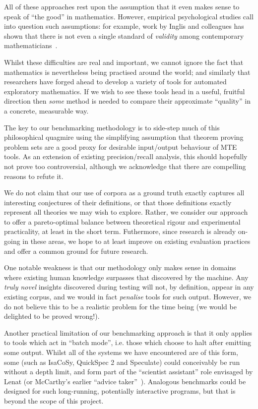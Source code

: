All of these approaches rest upon the assumption that it even makes sense to
speak of ``the good'' in mathematics. However, empirical psychological studies
call into question such assumptions: for example, work by Inglis and colleagues
has shown that there is not even a single standard of \emph{validity} among
contemporary mathematicians~\cite{inglis2013mathematicians}.

Whilst these difficulties are real and important, we cannot ignore the fact that
mathematics is nevertheless being practised around the world; and similarly that
researchers have forged ahead to develop a variety of tools for automated
exploratory mathematics. If we wish to see these tools head in a useful,
fruitful direction then \emph{some} method is needed to compare their
approximate ``quality'' in a concrete, measurable way.

The key to our benchmarking methodology is to side-step much of this
philosophical quagmire using the simplifying assumption that theorem proving
problem sets are a good proxy for desirable input/output behaviour of MTE tools.
As an extension of existing precision/recall analysis, this should hopefully not
prove too controversial, although we acknowledge that there are compelling
reasons to refute it.

We do not claim that our use of corpora as a ground truth exactly captures all
interesting conjectures of their definitions, or that those definitions exactly
represent all theories we may wish to explore. Rather, we consider our approach
to offer a pareto-optimal balance between theoretical rigour and experimental
practicality, at least in the short term. Futhermore, since research is already
on-going in these areas, we hope to at least improve on existing evaluation
practices and offer a common ground for future research.

One notable weakness is that our methodology only makes sense in domains where
existing human knowledge surpasses that discovered by the machine. Any
\emph{truly novel} insights discovered during testing will not, by definition,
appear in any existing corpus, and we would in fact \emph{penalise} tools for
such output. However, we do not believe this to be a realistic problem for the
time being (we would be delighted to be proved wrong!).

Another practical limitation of our benchmarking approach is that it only
applies to tools which act in ``batch mode'', i.e. those which choose to halt
after emitting some output. Whilst all of the systems we have encountered are of
this form, some (such as IsaCoSy, QuickSpec 2 and Speculate) could conceivably
be run without a depth limit, and form part of the ``scientist assistant'' role
envisaged by Lenat (or McCarthy's earlier ``advice
taker''~\cite{McCarthy_Programs59}). Analogous benchmarks could be designed for
such long-running, potentially interactive programs, but that is beyond the
scope of this project.


